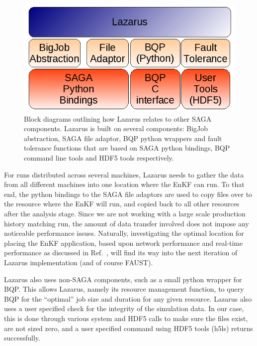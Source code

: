 \documentclass{sig-alternate}
\begin{document}
\begin{figure} 
  \begin{center} \includegraphics[scale=0.5]{./figures/Architecture.png} \caption{Block diagrams outlining how Lazarus relates to other SAGA components. Lazarus is built on several components: BigJob abstraction, SAGA file adaptor, BQP python wrappers and fault tolerance functions that are based on SAGA python bindings, BQP command line tools and HDF5 tools respectively.}\label{fig:application_architecture}
\end{center}
\end{figure}
 
For runs distributed across several machines, Lazarus needs to gather the data from all different machines into one location where the EnKF can run. To that end, the python bindings to the SAGA file adaptors are used to copy files over to the resource where the EnKF will run, and copied back to all other resources after the analysis stage. Since we are not working with a large scale production history matching run, the amount of data transfer involved does not impose any noticeable performance issues. Naturally, investigating the optimal location for placing the EnKF application, based upon network performance and real-time performance as discussed in Ref.~\cite{escience07}, will find its way into the next iteration of Lazarus implementation (and of course FAUST).

Lazarus also uses non-SAGA components, such as a small python wrapper
for BQP. This allows Lazarus, namely its resource management function,
to query BQP for the ``optimal'' job size and duration for any given
resource. Lazarus also uses a user specified check for the integrity
of the simulation data. In our case, this is done through various
system and HDF5 calls to make sure the files exist, are not sized
zero, and a user specified command using HDF5 tools (h5ls) returns
successfully.
\end{document}
